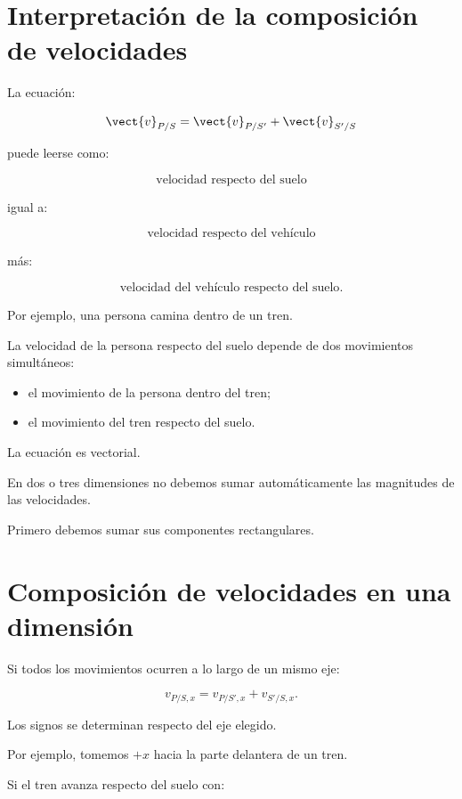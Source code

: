 \section{Interpretación de la composición de velocidades}

La ecuación:

\[
\vect{v}_{P/S}
=
\vect{v}_{P/S'}
+
\vect{v}_{S'/S}
\]

puede leerse como:

\[
\text{velocidad respecto del suelo}
\]

igual a:

\[
\text{velocidad respecto del vehículo}
\]

más:

\[
\text{velocidad del vehículo respecto del suelo}.
\]

Por ejemplo, una persona camina dentro de un tren.

La velocidad de la persona respecto del suelo depende
de dos movimientos simultáneos:

\begin{itemize}
    \item el movimiento de la persona dentro del tren;
    \item el movimiento del tren respecto del suelo.
\end{itemize}

\begin{advertencia}

La ecuación es vectorial.

En dos o tres dimensiones no debemos sumar automáticamente
las magnitudes de las velocidades.

Primero debemos sumar sus componentes rectangulares.

\end{advertencia}


\section{Composición de velocidades en una dimensión}

Si todos los movimientos ocurren a lo largo de un mismo eje:

\[
\boxed{
v_{P/S,x}
=
v_{P/S',x}
+
v_{S'/S,x}
}.
\]

Los signos se determinan respecto del eje elegido.

Por ejemplo, tomemos \(+x\) hacia la parte delantera
de un tren.

Si el tren avanza respecto del suelo con:

